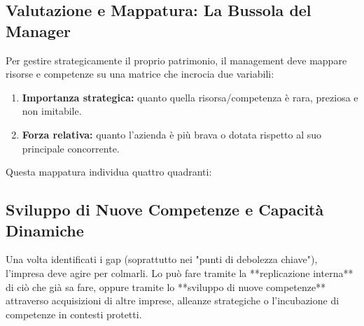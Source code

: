 \documentclass[a4paper,10pt]{article}
\begin{document}
\subsection*{Valutazione e Mappatura: La Bussola del Manager}

Per gestire strategicamente il proprio patrimonio, il management deve mappare risorse e competenze su una matrice che incrocia due variabili:
\begin{enumerate}
    \item \textbf{Importanza strategica:} quanto quella risorsa/competenza è rara, preziosa e non imitabile.
    \item \textbf{Forza relativa:} quanto l'azienda è più brava o dotata rispetto al suo principale concorrente.
\end{enumerate}

Questa mappatura individua quattro quadranti:
\begin{table}[H]
\setlength{\extrarowheight}{10pt}
\caption{Matrice di valutazione delle risorse e competenze}
\end{table}

\subsection*{Sviluppo di Nuove Competenze e Capacità Dinamiche}

Una volta identificati i gap (soprattutto nei "punti di debolezza chiave"), l'impresa deve agire per colmarli. Lo può fare tramite la **replicazione interna** di ciò che già sa fare, oppure tramite lo **sviluppo di nuove competenze** attraverso acquisizioni di altre imprese, alleanze strategiche o l'incubazione di competenze in contesti protetti.
\end{document}
